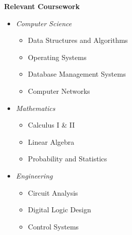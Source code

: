 \textcolor{accentcolor}{\textbf{\large {Relevant Coursework}}} \\[0.1cm]

\begin{itemize}[left=0pt]
    \item \textit{Computer Science}
    \begin{itemize}
        \item Data Structures and Algorithms
        \item Operating Systems
        \item Database Management Systems
        \item Computer Networks
    \end{itemize}
    \item \textit{Mathematics}
    \begin{itemize}
        \item Calculus I & II
        \item Linear Algebra
        \item Probability and Statistics
    \end{itemize}
    \item \textit{Engineering}
    \begin{itemize}
        \item Circuit Analysis
        \item Digital Logic Design
        \item Control Systems
    \end{itemize}
\end{itemize}
